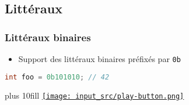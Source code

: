 \documentclass[C++.tex]{subfiles}
\begin{document}
\subsection*{Littéraux}
\begin{frame}[fragile]
	\frametitle{Littéraux binaires}
	\begin{itemize}
		\item Support des littéraux binaires préfixés par \lstinline|0b|
	\end{itemize}

	\begin{lstlisting}[language=C++]
int foo = 0b101010; // 42\end{lstlisting}

	\vskip 10mm plus 10fill
	\hfill
	\href{https://godbolt.org/#g:!((g:!((g:!((h:codeEditor,i:(filename:'1',fontScale:14,fontUsePx:'0',j:1,lang:c%2B%2B,selection:(endColumn:1,endLineNumber:8,positionColumn:1,positionLineNumber:8,selectionStartColumn:1,selectionStartLineNumber:8,startColumn:1,startLineNumber:8),source:'%23include+%3Ciostream%3E%0A%0Aint+main()%0A%7B%0A++int+foo+%3D+0b101010%3B%0A%0A++std::cout+%3C%3C+foo+%3C%3C+!'%5Cn!'%3B%0A%7D%0A'),l:'5',n:'0',o:'C%2B%2B+source+%231',t:'0')),k:50,l:'4',n:'0',o:'',s:0,t:'0'),(g:!((h:executor,i:(argsPanelShown:'1',compilationPanelShown:'0',compiler:g112,compilerOutShown:'0',execArgs:'',execStdin:'',fontScale:14,fontUsePx:'0',j:1,lang:c%2B%2B,libs:!((name:boost,ver:'175')),options:'-std%3Dc%2B%2B14',source:1,stdinPanelShown:'1',tree:'1',wrap:'0'),l:'5',n:'0',o:'Executor+x86-64+gcc+11.2+(C%2B%2B,+Editor+%231)',t:'0')),header:(),k:50,l:'4',n:'0',o:'',s:0,t:'0')),l:'2',n:'0',o:'',t:'0')),version:4}{\texttt{[image: input\_src/play-button.png]}}
\end{frame}
\end{document}
